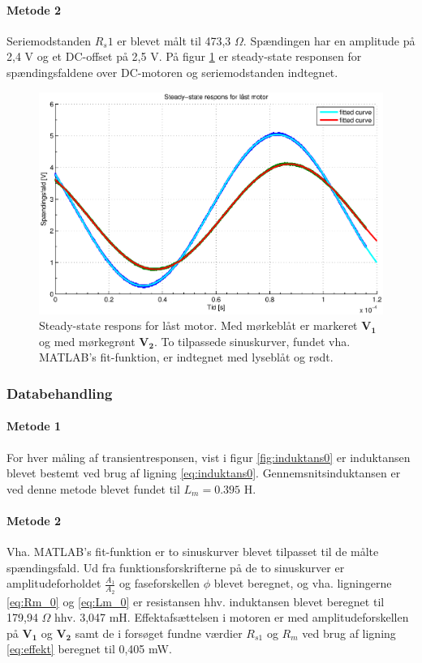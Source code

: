 \paragraph{Metode 2}
Seriemodstanden $R_s1$ er blevet målt til 473,3 $\Omega$.
Spændingen har en amplitude på 2,4 V og et DC-offset på 2,5 V.
På figur \ref{fig:induktans1} er steady-state responsen for spændingsfaldene over DC-motoren og seriemodstanden indtegnet.
\begin{figure}[th!]
	\centering
	\includegraphics[width=1\textwidth]{./graphics/induktans1.eps}
	\caption[Steady-state respons for låst motor]
		{Steady-state respons for låst motor. Med mørkeblåt er markeret $\mathbf{V_1}$ og med mørkegrønt $\mathbf{V_2}$.
		To tilpassede sinuskurver, fundet vha. MATLAB's fit-funktion, er indtegnet med lyseblåt og rødt.}
	\label{fig:induktans1}
\end{figure}
\subsubsection{Databehandling}
\paragraph{Metode 1}
For hver måling af transientresponsen, vist i figur \ref{fig:induktans0} er induktansen blevet
bestemt ved brug af ligning \ref{eq:induktans0}.
Gennemsnitsinduktansen er ved denne metode blevet fundet til $L_m=0.395$ H.
\paragraph{Metode 2}
Vha. MATLAB's fit-funktion er to sinuskurver blevet tilpasset til de målte spændingsfald.
Ud fra funktionsforskrifterne på de to sinuskurver er amplitudeforholdet $\frac{A_1}{A_2}$
og faseforskellen $\phi$ blevet beregnet,
og vha. ligningerne \ref{eq:Rm_0} og \ref{eq:Lm_0} er resistansen hhv. induktansen blevet beregnet til
179,94 $\Omega$ hhv. 3,047 mH.
Effektafsættelsen i motoren er med amplitudeforskellen på $\mathbf{V_1}$ og $\mathbf{V_2}$ samt
de i forsøget fundne værdier $R_{s1}$ og $R_m$ ved brug af ligning \ref{eq:effekt} beregnet til 0,405 mW.
